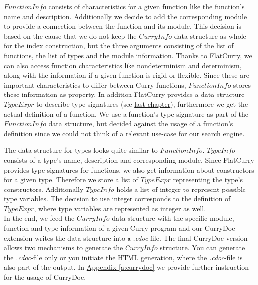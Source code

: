 \documentclass[%
	pdftex,%
	a4paper,%
	oneside,%
	chapterprefix,%
	headsepline,%
	12pt%
]{scrbook}
\newcommand{\Conid}[1]{\mathit{#1}}
\begin{document}
\ensuremath{\Conid{FunctionInfo}} consists of characteristics for a given function like
the function's name and description. Additionally we decide to add the
corresponding module to provide a connection between the function and
its module. This decision is based on the cause that we do not keep
the \ensuremath{\Conid{CurryInfo}} data structure as whole for the index construction,
but the three arguments consisting of the list of functions, the list
of types and the module information. Thanks to FlatCurry, we can also
access function characteristics like nondeterminism and determinism,
along with the information if a given function is rigid or
flexible. Since these are important characteristics to differ between
Curry functions, \ensuremath{\Conid{FunctionInfo}} stores these information as
property. In addition FlatCurry provides a data structure \ensuremath{\Conid{TypeExpr}}
to describe type signatures (see \hyperref[fig:typeExpr]{last
  chapter}), furthermore we get the actual definition of a
function. We use a function's type signature as part of the
\ensuremath{\Conid{FunctionInfo}} data structure, but decided against the usage of a
function's definition since we could not think of a relevant use-case
for our search engine.

The data structure for types looks quite similar to
\ensuremath{\Conid{FunctionInfo}}. \ensuremath{\Conid{TypeInfo}} consists of a type's name, description and
corresponding module. Since FlatCurry provides type signatures for
functions, we also get information about constructors for a given
type. Therefore we store a list of \ensuremath{\Conid{TypeExpr}} representing the type's
constructors. Additionally \ensuremath{\Conid{TypeInfo}} holds a list of integer to
represent possible type variables. The decision to use integer corresponds to
the definition of \ensuremath{\Conid{TypeExpr}}, where type variables are represented as
integer as well. \\

In the end, we feed the \ensuremath{\Conid{CurryInfo}} data structure with the specific
module, function and type information of a given Curry program and our
CurryDoc extension writes the data structure into a
\emph{.cdoc}-file. The final CurryDoc version allows two mechanisms to
generate the \ensuremath{\Conid{CurryInfo}} structure. You can generate the
\emph{.cdoc}-file only or you initiate the HTML generation, where the
\emph{.cdoc}-file is also part of the output. In
\hyperref[a:currydoc]{Appendix \ref{a:currydoc}} we provide further
instruction for the usage of CurryDoc.
\end{document}
